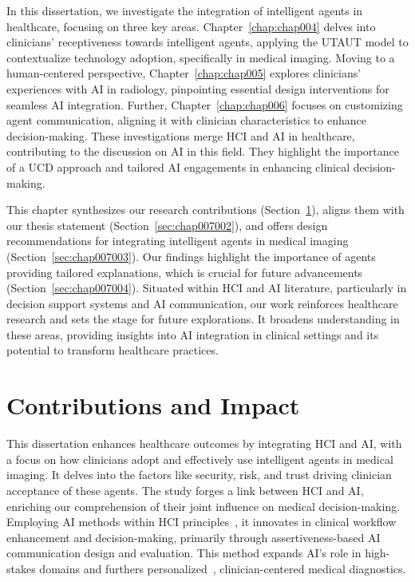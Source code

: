 \clearpage
\label{chap:chap007}

\textcolor{revised}{In this dissertation, we investigate the integration of intelligent agents in healthcare, focusing on three key areas.
Chapter~\ref{chap:chap004} delves into clinicians' receptiveness towards intelligent agents, applying the \ac{UTAUT} model to contextualize technology adoption, specifically in medical imaging.
Moving to a human-centered perspective, Chapter~\ref{chap:chap005} explores clinicians' experiences with \ac{AI} in radiology, pinpointing essential design interventions for seamless \ac{AI} integration.
Further, Chapter~\ref{chap:chap006} focuses on customizing agent communication, aligning it with clinician characteristics to enhance decision-making.
These investigations merge \ac{HCI} and \ac{AI} in healthcare, contributing to the discussion on \ac{AI} in this field.
They highlight the importance of a \ac{UCD} approach and tailored \ac{AI} engagements in enhancing clinical decision-making.}

\textcolor{revised}{This chapter synthesizes our research contributions (Section~\ref{sec:chap007001}), aligns them with our thesis statement (Section~\ref{sec:chap007002}), and offers design recommendations for integrating intelligent agents in medical imaging (Section~\ref{sec:chap007003}).
Our findings highlight the importance of agents providing tailored explanations, which is crucial for future advancements (Section~\ref{sec:chap007004}).
Situated within \ac{HCI} and \ac{AI} literature, particularly in decision support systems and \ac{AI} communication, our work reinforces healthcare research and sets the stage for future explorations.
It broadens understanding in these areas, providing insights into \ac{AI} integration in clinical settings and its potential to transform healthcare practices.}

\section{Contributions and Impact}
\label{sec:chap007001}

\textcolor{revised}{This dissertation enhances healthcare outcomes by integrating \ac{HCI} and \ac{AI}, with a focus on how clinicians adopt and effectively use intelligent agents in medical imaging.
It delves into the factors like security, risk, and trust driving clinician acceptance of these agents.
The study forges a link between \ac{HCI} and \ac{AI}, enriching our comprehension of their joint influence on medical decision-making.
Employing \ac{AI} methods within \ac{HCI} principles~\cite{10.1145/3290605.3300233}, it innovates in clinical workflow enhancement and decision-making, primarily through assertiveness-based \ac{AI} communication design and evaluation.
This method expands \ac{AI}'s role in high-stakes domains and furthers personalized~\cite{OPRESCU202253}, clinician-centered medical diagnostics.}

